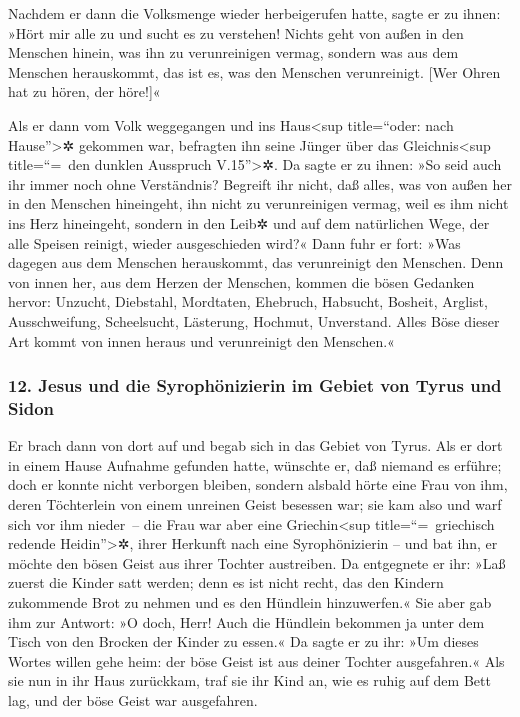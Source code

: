  Nachdem er dann die Volksmenge wieder herbeigerufen
hatte, sagte er zu ihnen: »Hört mir alle zu und sucht es zu verstehen!
 Nichts geht von außen in den Menschen hinein, was ihn zu
verunreinigen vermag, sondern was aus dem Menschen herauskommt, das ist
es, was den Menschen verunreinigt.  {[}Wer Ohren hat zu
hören, der höre!{]}«

 Als er dann vom Volk weggegangen und ins
Haus\textless sup title=``oder: nach Hause''\textgreater✲ gekommen war,
befragten ihn seine Jünger über das Gleichnis\textless sup title=``=~den
dunklen Ausspruch V.15''\textgreater✲.  Da sagte er zu
ihnen: »So seid auch ihr immer noch ohne Verständnis? Begreift ihr
nicht, daß alles, was von außen her in den Menschen hineingeht, ihn
nicht zu verunreinigen vermag,  weil es ihm nicht ins
Herz hineingeht, sondern in den Leib✲ und auf dem natürlichen Wege, der
alle Speisen reinigt, wieder ausgeschieden wird?«  Dann
fuhr er fort: »Was dagegen aus dem Menschen herauskommt, das
verunreinigt den Menschen.  Denn von innen her, aus dem
Herzen der Menschen, kommen die bösen Gedanken hervor: Unzucht,
Diebstahl, Mordtaten,  Ehebruch, Habsucht, Bosheit,
Arglist, Ausschweifung, Scheelsucht, Lästerung, Hochmut, Unverstand.
 Alles Böse dieser Art kommt von innen heraus und
verunreinigt den Menschen.«

\hypertarget{jesus-und-die-syrophuxf6nizierin-im-gebiet-von-tyrus-und-sidon}{%
\subsubsection{12. Jesus und die Syrophönizierin im Gebiet von Tyrus und
Sidon}\label{jesus-und-die-syrophuxf6nizierin-im-gebiet-von-tyrus-und-sidon}}

 Er brach dann von dort auf und begab sich in das Gebiet
von Tyrus. Als er dort in einem Hause Aufnahme gefunden hatte, wünschte
er, daß niemand es erführe; doch er konnte nicht verborgen bleiben,
 sondern alsbald hörte eine Frau von ihm, deren
Töchterlein von einem unreinen Geist besessen war; sie kam also und warf
sich vor ihm nieder~--  die Frau war aber eine
Griechin\textless sup title=``=~griechisch redende
Heidin''\textgreater✲, ihrer Herkunft nach eine Syrophönizierin -- und
bat ihn, er möchte den bösen Geist aus ihrer Tochter austreiben.
 Da entgegnete er ihr: »Laß zuerst die Kinder satt
werden; denn es ist nicht recht, das den Kindern zukommende Brot zu
nehmen und es den Hündlein hinzuwerfen.«  Sie aber gab
ihm zur Antwort: »O doch, Herr! Auch die Hündlein bekommen ja unter dem
Tisch von den Brocken der Kinder zu essen.«  Da sagte er
zu ihr: »Um dieses Wortes willen gehe heim: der böse Geist ist aus
deiner Tochter ausgefahren.«  Als sie nun in ihr Haus
zurückkam, traf sie ihr Kind an, wie es ruhig auf dem Bett lag, und der
böse Geist war ausgefahren.

